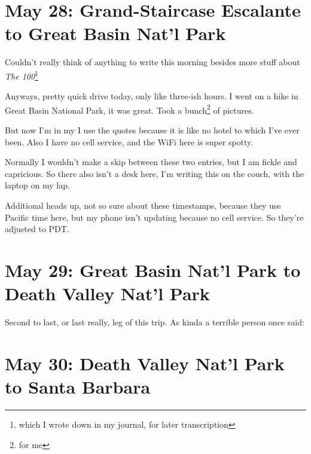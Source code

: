 \documentclass[../butidigress.tex]{subfiles}
\begin{document}
\section{May 28: Grand-Staircase Escalante to Great Basin Nat'l Park}
Couldn't really think of anything to write this morning besides more stuff about \textit{The 100}\footnote{which I wrote down in my journal, for later transcription}

Anyways, pretty quick drive today, only like three-ish hours.
I went on a hike in Great Basin National Park, it was great.
Took a bunch\footnote{for me} of pictures.

But now I'm in my 
I use the quotes because it is like no hotel to which I've ever been.
Also I have no cell service, and the WiFi here is super spotty.

\entryskip

Normally I wouldn't make a skip between these two entries, but I am fickle and capricious.
So there also isn't a desk here, I'm writing this on the couch, with the laptop on my lap.

Additional heads up, not so sure about these timestamps, because they use Pacific time here, but my phone isn't updating because no cell service.
So they're adjusted to PDT.

\section{May 29: Great Basin Nat'l Park to Death Valley Nat'l Park}
Second to last, or last really, leg of this trip.
As kinda a terrible person once said: 

\section{May 30: Death Valley Nat'l Park to Santa Barbara}

\renewcommand{\thesection}{\thechapter .\arabic{section}}

\newlength{\episkip}
\setlength{\episkip}{0.5cm}
\newcommand{\postepi}{\vspace{\episkip}\noindent\hfill\rule{0.5\textwidth}{1pt}\hfill\vspace{\episkip}}
\end{document}
